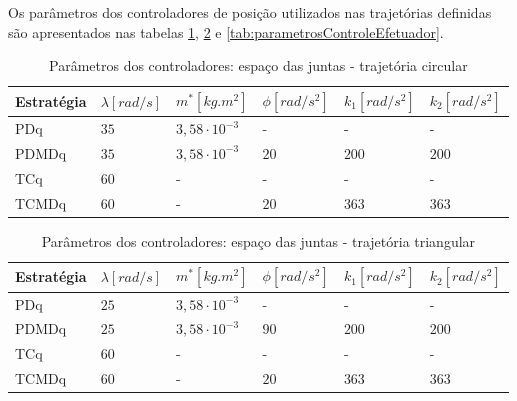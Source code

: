 \documentclass[]{politex}
\begin{document}
Os parâmetros dos controladores de posição utilizados nas trajetórias definidas são apresentados nas tabelas \ref{tab:parametrosControleAtuadoresCirculo}, \ref{tab:parametrosControleAtuadoresTriangulo} e \ref{tab:parametrosControleEfetuador}.
\begin{table}[H] 
\centering
\caption{Parâmetros dos controladores: espaço das juntas - trajetória circular}
\label{tab:parametrosControleAtuadoresCirculo}
\begin{tabular}{l|l|l|l|l|l}
Estratégia & $\lambda [rad/s]$  & $m^*[kg.m^2]$ & $\phi[rad/s^2]$   & $k_1[rad/s^2]$ & $k_2[rad/s^2]$ \\ \hline
PDq        & $35$               & $3{,}58 \cdot 10^{-3}$  & -         & -              & -              \\
PDMDq      & $35$               & $3{,}58 \cdot 10^{-3}$  & $20$      & $200$          & $200$          \\
TCq        & $60$               & -                     & -         & -              & -              \\
TCMDq      & $60$               & -                     & $20$      & $363$          & $363$          \\
\end{tabular}
\end{table}
\begin{table}[H] 
\centering
\caption{Parâmetros dos controladores: espaço das juntas - trajetória triangular}
\label{tab:parametrosControleAtuadoresTriangulo}
\begin{tabular}{l|l|l|l|l|l}
Estratégia & $\lambda [rad/s]$  & $m^*[kg.m^2]$         & $\phi[rad/s^2]$   & $k_1[rad/s^2]$ & $k_2[rad/s^2]$ \\ \hline
PDq        & $25$               & $3{,}58 \cdot 10^{-3}$  & -         & -              & -              \\
PDMDq      & $25$               & $3{,}58 \cdot 10^{-3}$  & $90$      & $200$          & $200$          \\
TCq        & $60$               & -                     & -         & -              & -              \\
TCMDq      & $60$               & -                     & $20$      & $363$          & $363$          \\
\end{tabular}
\end{table}
\end{document}
